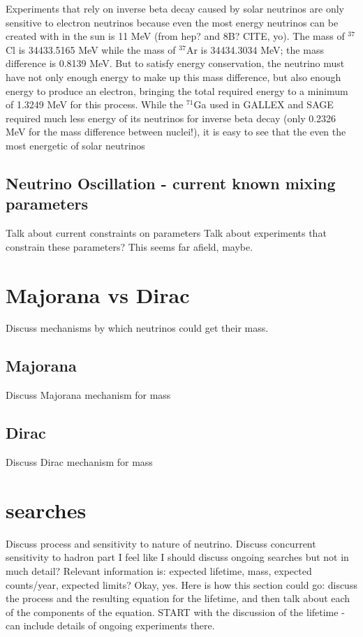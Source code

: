 Experiments that rely on inverse beta decay caused by solar neutrinos are only sensitive to electron neutrinos because even the most energy neutrinos can be created with in the sun is 11 MeV (from hep? and 8B? CITE, yo).  The mass of $^{37}$Cl is 34433.5165 MeV while the mass of $^{37}$Ar is 34434.3034 MeV; the mass difference is 0.8139 MeV.  But to satisfy energy conservation, the neutrino must have not only enough energy to make up this mass difference, but also enough energy to produce an electron, bringing the total required energy to a minimum of 1.3249 MeV for this process.  While the $^{71}$Ga used in GALLEX and SAGE required much less energy of its neutrinos for inverse beta decay (only 0.2326 MeV for the mass difference between nuclei!), it is easy to see that the even the most energetic of solar neutrinos  

\subsection{Neutrino Oscillation - current known mixing parameters}
Talk about current constraints on parameters
Talk about experiments that constrain these parameters?  This seems far afield, maybe.

\section{Majorana vs Dirac}
\label{sec:mVd}
Discuss mechanisms by which neutrinos could get their mass.  

\subsection{Majorana}
Discuss Majorana mechanism for mass

\subsection{Dirac}
Discuss Dirac mechanism for mass

\section{\zvbb searches}
Discuss \zvbb process and sensitivity to nature of neutrino.
Discuss concurrent sensitivity to hadron part
I feel like I should discuss ongoing searches but not in much detail?  Relevant information is: expected lifetime, mass, expected counts/year, expected limits?
Okay, yes.  Here is how this section could go: discuss the process and the resulting equation for the lifetime, and then talk about each of the components of the equation.  START with the discussion of the lifetime - can include details of ongoing experiments there.

